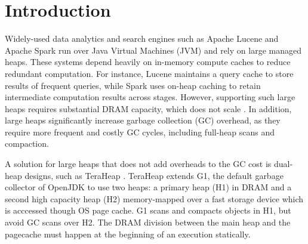 \section{Introduction}



Widely-used data analytics and search engines such as Apache Lucene
\cite{klinaftakis2025thesis} and Apache Spark \cite{spark3.3} run over Java Virtual
Machines (JVM) and rely on large managed heaps. These systems depend heavily on in-memory compute caches
to reduce redundant computation. For instance, Lucene maintains a query cache to
store results of frequent queries, while Spark uses on-heap caching to retain 
intermediate computation results across stages. However, supporting such large heaps
requires substantial DRAM capacity, which does not scale \cite{mandelman2002dram, white2011dram}.
In addition, large heaps significantly increase garbage collection (GC) overhead,
as they require more frequent and costly GC cycles, including full-heap scans and compaction. 

A solution for large heaps that does not add overheads to the GC cost is
dual-heap designs, such as TeraHeap \cite{teraheap_asplos}. TeraHeap extends
G1, the default garbage collector of OpenJDK to use two heaps: a primary heap
(H1) in DRAM and a second high capacity heap (H2) memory-mapped over a fast
storage device which is acccessed though OS page cache. G1 scans and compacts
objects in H1, but avoid GC scans over H2. The DRAM division between the main
heap and the pagecache must happen at the beginning of an execution statically.

